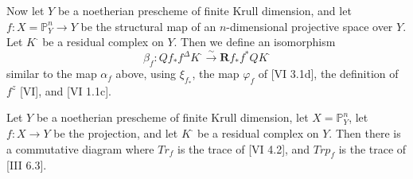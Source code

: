 \documentclass[12pt]{book}
\begin{document}
Now let \(Y\) be a noetherian prescheme of finite Krull dimension,
and let \(f: X=\mathbb{P}_{Y}^{n} \to Y\) be the structural map of an \(n\)-dimensional projective space over \(Y\).
Let \(K^{\cdot}\) be a residual complex on \(Y\).
Then we define an isomorphism
\[\beta_{f}: Q f_{*} f^{\Delta} K^{\cdot} \stackrel{\sim}{\to} \mathbf{R} f_{*} f^{*} Q K^{\cdot}\]
similar to the map \(\alpha_{f}\) above, using \(\xi_{f_{*}}\),
the map \(\varphi_{f}\) of [VI 3.1d], the definition of \(f^{z}\) [VI], and [VI 1.1c].

\begin{proposition}
Let \(Y\) be a noetherian prescheme of finite Krull dimension,
let \(X=\mathbb{P}_{Y}^{n}\), let \(f: X \to Y\) be the projection,
and let \(K^{\cdot}\) be a residual complex on \(Y\).
Then there is a commutative diagram
where \(Tr_{f}\) is the trace of [VI 4.2], and \(Trp_{f}\) is the trace of [III 6.3].
\end{proposition}
\end{document}
